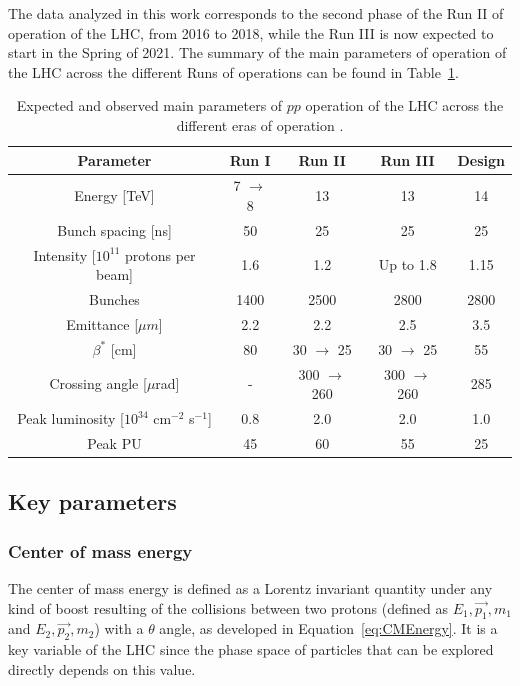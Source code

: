\documentclass[a4paper, 10pt, openright]{report}
\begin{document}
The data analyzed in this work corresponds to the second phase of the Run II of operation of the \ac{LHC}, from 2016 to 2018, while the Run III is now expected to start in the Spring of 2021. The summary of the main parameters of operation of the \ac{LHC} across the different Runs of operations can be found in Table~\ref{table:LHCRuns}.

\begin{table}
\begin{center}
\begin{tabular}{ c|c|c|c|c } 
 \hline
 Parameter & Run I & Run II & Run III & Design \\
\hline
Energy [TeV] & 7 $\rightarrow$ 8 & 13 & 13 & 14 \\
Bunch spacing [ns] & 50 & 25 & 25 & 25 \\
Intensity [$10^{11}$ protons per beam] & 1.6 & 1.2 & Up to 1.8 & 1.15 \\
Bunches & 1400 & 2500 & 2800 & 2800 \\
Emittance [$\mu m$] & 2.2 & 2.2 & 2.5 & 3.5 \\
$\beta^*$ [cm] & 80 & 30 $\rightarrow$ 25 & 30 $\rightarrow$ 25 & 55 \\
Crossing angle [$\mu$rad] & - & 300 $\rightarrow$ 260 & 300 $\rightarrow$ 260 & 285 \\
Peak luminosity [$10^{34}$ cm$^{-2}$ s$^{-1}$] & 0.8 & 2.0 & 2.0 & 1.0 \\
Peak \ac{PU} & 45 & 60 & 55 & 25 \\
 \hline
\end{tabular}
\caption{ Expected and observed main parameters of $pp$ operation of the \ac{LHC} across the different eras of operation \cite{LHCRuns}.}
\label{table:LHCRuns}
\end{center}
\end{table}

\subsection{Key parameters}\label{section:LHCParams}

\subsubsection{Center of mass energy} \label{subsection:CMEnergy}

The center of mass energy is defined as a Lorentz invariant quantity under any kind of boost resulting of the collisions between two protons (defined as $E_1, \overrightarrow{p_1}, m_1$ and $E_2, \overrightarrow{p_2}, m_2$) with a $\theta$ angle, as developed in Equation~\ref{eq:CMEnergy}. It is a key variable of the \ac{LHC} since the phase space of particles that can be explored directly depends on this value.
\end{document}
